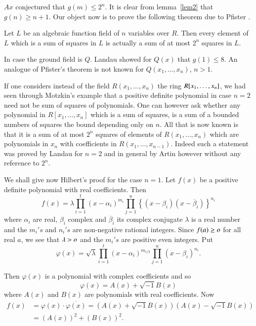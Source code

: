 $Ax$ conjectured that $g(m)\leq 2^{n}$. It is clear from lemma~\ref{lem2} that $g(n)\geq n+1$. Our object now is to prove the
following theorem due to Pfister \cite{key13}.

\begin{thm}[Pfister]\label{thm13}
Let $L$ be an algebraic function field of $n$ variables over $R$. Then
every element of $L$ which is a sum of squares in $L$ is actually a
sum of at most $2^{n}$ squares in $L$. 
\end{thm}


In case the ground field is $Q$. Landau showed for $Q(x)$ that
$g(1)\leq 8$. An analogue of Pfister's theorem is not known for
$Q(x_1,\ldots,x_n)$, $n>1$. 

If one considers instead of the field $R(x_1,\ldots,x_n)$ the ring
$R[x_1,\ldots,\break x_n]$, we had seen through Motzkin's example that a
positive definite polynomial in case $n=2$ need not be sum of squares
of polynomials. One can however ask whether any polynomial in
$R[x_1,\ldots,x_n]$ which is a sum of squares, is a sum of a bounded
numbers of squares the bound depending only on $n$. All that is now
known is that it is a sum of at most $2^{n}$ squares of elements of
$R(x_1,\ldots,x_n)$ which are polynomials in $x_n$ with coefficients in
$R(x_1,\ldots,x_{n-1})$. Indeed such a statement was proved by Landau
\cite{key10} for $n=2$ and in general by Artin \cite{key1} however
without any reference to $2^{n}$.

We shall give now Hilbert's proof for the case $n=1$. Let $f(x)$ be a
positive definite polynomial with real coefficients.  Then 
$$
f(x)=\lambda
\prod\limits_{i=1}^{t}(x-\alpha_i)^{m_i}\prod\limits_{j=1}^{u}\left\{(x-\beta_i)(x-\overline{\beta}_i)\right\}^{n_i}
$$
where $\alpha_i$ are real, $\beta_i$ complex and $\overline{\beta}_i$
its complex conjugate $\lambda$ is a
real number and the $m_i's$ and $n_i's$ are non-negative rational
integers. Since $f(a)\geq o$ for all real $a$, we see that $\lambda
> o$ and the $m_i's$ are positive even integers. Put 
$$
\varphi(x)=\sqrt{\lambda}\prod\limits_{i=1}^{t}(x-\alpha_i)^{m_{i/2}}\prod\limits_{j=1}^{u}(x-\beta_i)^{n_i}.
$$

Then $\varphi(x)$ is a polynomial with complex coefficients and so 
$$
\varphi(x)=A(x)+\sqrt{-1} B(x)
$$
where $A(x)$ and $B(x)$ are polynomials with real coefficients. Now 
\begin{align*}
f(x)&=\varphi(x)\cdot
\overline{\varphi(x)}=(A(x)+\sqrt{-1}B(x))(A(x)-\sqrt{-1} B(x))\\
&=(A(x))^{2}+(B(x))^{2}.
\end{align*}

